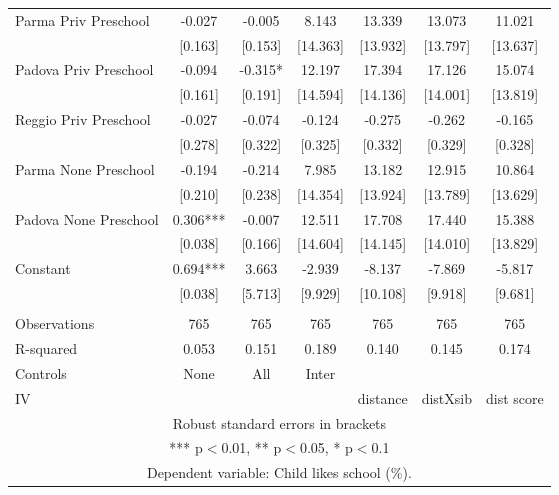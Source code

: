 \begin{tabular}{lcccccc}
Parma Priv Preschool & -0.027 & -0.005 & 8.143 & 13.339 & 13.073 & 11.021 \\
 & [0.163] & [0.153] & [14.363] & [13.932] & [13.797] & [13.637] \\
Padova Priv Preschool & -0.094 & -0.315* & 12.197 & 17.394 & 17.126 & 15.074 \\
 & [0.161] & [0.191] & [14.594] & [14.136] & [14.001] & [13.819] \\
Reggio Priv Preschool & -0.027 & -0.074 & -0.124 & -0.275 & -0.262 & -0.165 \\
 & [0.278] & [0.322] & [0.325] & [0.332] & [0.329] & [0.328] \\
Parma None Preschool & -0.194 & -0.214 & 7.985 & 13.182 & 12.915 & 10.864 \\
 & [0.210] & [0.238] & [14.354] & [13.924] & [13.789] & [13.629] \\
Padova None Preschool & 0.306*** & -0.007 & 12.511 & 17.708 & 17.440 & 15.388 \\
 & [0.038] & [0.166] & [14.604] & [14.145] & [14.010] & [13.829] \\
Constant & 0.694*** & 3.663 & -2.939 & -8.137 & -7.869 & -5.817 \\
 & [0.038] & [5.713] & [9.929] & [10.108] & [9.918] & [9.681] \\
 &  &  &  &  &  &  \\
Observations & 765 & 765 & 765 & 765 & 765 & 765 \\
R-squared & 0.053 & 0.151 & 0.189 & 0.140 & 0.145 & 0.174 \\
Controls & None & All & Inter &  &  &  \\
 IV &  &  &  & distance & distXsib & dist score \\ \hline
\multicolumn{7}{c}{ Robust standard errors in brackets} \\
\multicolumn{7}{c}{ *** p$<$0.01, ** p$<$0.05, * p$<$0.1} \\
\multicolumn{7}{c}{ Dependent variable: Child likes school (\%).} \\
\end{tabular}
